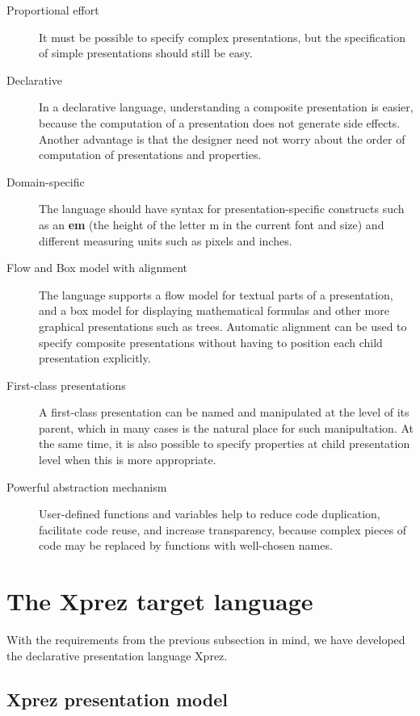 \begin{description}
\item[Proportional effort]
It must be possible to specify complex presentations, but the specification of simple presentations should still be easy.
\item[Declarative]
In a declarative language, understanding a composite presentation is easier, because the computation of a presentation does not generate side effects. Another advantage is that the designer need not worry about the order of computation of presentations and properties.
\item[Domain-specific]
The language should have syntax for presentation-specific constructs such as an {\bf em} (the height of the letter m in the current font and size) and different measuring units such as pixels and inches.
\item[Flow and Box model with alignment]
The language supports a flow model for textual parts of a presentation, and a box model for displaying mathematical formulas and other more graphical presentations such as trees. Automatic alignment can be used to specify composite presentations without having to position each child presentation explicitly.
\item[First-class presentations]
A first-class presentation can be named and manipulated at the level of its parent, which in many cases is the natural place for such manipultation. At the same time, it is also possible to specify properties at child presentation level when this is more appropriate. 
\item[Powerful abstraction mechanism]
User-defined functions and var\-i\-ables help to reduce code duplication, facilitate code reuse, and increase transparency, because complex pieces of code may be replaced by functions with well-chosen names.
\end{description}

%																
%																
%																
\section{The {\sc Xprez} target language} \label{sect:xpreztarget}

With the requirements from the previous subsection in mind, we have developed the declarative presentation language {\sc Xprez}. 

%																
\subsection{{\sc Xprez} presentation model}

